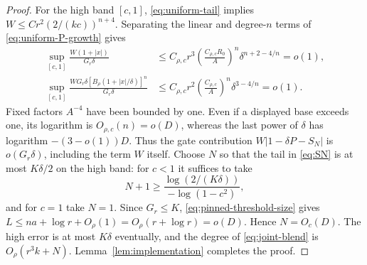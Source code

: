 \begin{proof}
For the high band $[c,1]$, \eqref{eq:uniform-tail} implies
$W\leq C r^2(2/(kc))^{n+4}$. Separating the linear and degree-$n$ terms of \eqref{eq:uniform-P-growth} gives
\begin{align*}
 \sup_{[c,1]}\frac{W(1+|x|)}{G_r\delta}
 &\leq C_{\rho,c}r^3
       \left(\frac{C_{\rho,c}R_0}{A}\right)^n
          \delta^{n+2-4/n}=o(1),\\
 \sup_{[c,1]}\frac{W G_r\delta
                    [B_\rho(1+|x|/\delta)]^n}{G_r\delta}
 &\leq C_{\rho,c}r^2
       \left(\frac{C_{\rho,c}}{A}\right)^n
          \delta^{3-4/n}=o(1).
\end{align*}
Fixed factors $A^{-4}$ have been bounded by one. Even if a displayed base exceeds one, its logarithm is $O_{\rho,c}(n)=o(D)$, whereas the last power of $\delta$ has logarithm $-(3-o(1))D$. Thus the gate contribution $W|1-\delta P-S_N|$ is $o(G_r\delta)$, including the term $W$ itself. Choose $N$ so that the tail in \eqref{eq:SN} is at most $K\delta/2$ on the high band: for $c<1$ it suffices to take
\[
 N+1\geq\frac{\log(2/(K\delta))}{-\log(1-c^2)},
\]
and for $c=1$ take $N=1$. Since $G_r\leq K$, \eqref{eq:pinned-threshold-size} gives $L\leq na+\log r+O_\rho(1)=O_\rho(r+\log r)=o(D)$. Hence $N=O_c(D)$. The high error is at most $K\delta$ eventually, and the degree of \eqref{eq:joint-blend} is $O_\rho(r^3k+N)$. Lemma~\ref{lem:implementation} completes the proof.
\end{proof}

